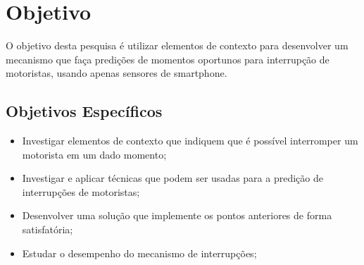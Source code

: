 \chapter{Objetivo}
\label{objetivo}
O objetivo desta pesquisa é utilizar elementos de contexto para desenvolver um mecanismo que faça predições de
momentos oportunos para interrupção de motoristas, usando apenas sensores de smartphone.

\section{Objetivos Específicos}
\label{objetivos-esp}
\begin{itemize}
  \item Investigar elementos de contexto que indiquem que é possível interromper um motorista em um dado momento;
  \item Investigar e aplicar técnicas que podem ser usadas para a predição de interrupções de motoristas;
  \item Desenvolver uma solução que implemente os pontos anteriores de forma satisfatória;
  \item Estudar o desempenho do mecanismo de interrupções;
\end{itemize}
